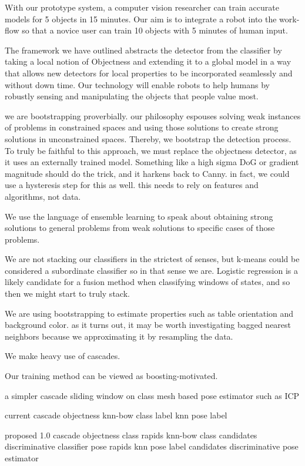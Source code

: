 \documentclass[12pt]{article}
\numberwithin{equation}{section}
\numberwithin{table}{section}
\numberwithin{figure}{section}
\begin{document}
With our prototype system, a computer vision researcher can train accurate models for 5
objects in 15 minutes. Our aim is to integrate a robot into the work-flow so that a novice
user can train 10 objects with 5 minutes of human input.

The framework we have outlined abstracts the detector from the classifier by taking a local notion 
of Objectness and extending it to a global model in a way that allows new detectors 
for local properties to be incorporated seamlessly and without down time.  Our technology 
will enable robots to help humans by robustly sensing and manipulating the objects that people value most.

\newpage

we are bootstrapping proverbially. our philosophy espouses solving weak instances of problems in constrained spaces and using those solutions to create strong solutions in unconstrained spaces.  Thereby, we bootstrap the detection process. To truly be faithful to this approach, we must replace the objectness detector, as it uses an externally trained model. Something like a high sigma DoG or gradient magnitude should do the trick, and it harkens back to Canny.  in fact, we could use a hysteresis step for this as well. this needs to rely on features and algorithms, not data.

We use the language of ensemble learning to speak about obtaining strong solutions to general problems from weak solutions to specific cases of those problems. 

We are not stacking our classifiers in the strictest of senses, but k-means could be considered a subordinate classifier so in that sense we are.  Logistic regression is a likely candidate for a fusion method when classifying windows of states, and so then we might start to truly stack.

We are using bootstrapping to estimate properties such as table orientation and background color. as it turns out, it may be worth investigating bagged nearest neighbors because we approximating it by resampling the data.

We make heavy use of cascades.

Our training method can be viewed as boosting-motivated.

a simpler cascade
sliding window on class
mesh based pose estimator such as ICP

current cascade
objectness
knn-bow class label
knn pose label


proposed 1.0 cascade
objectness
class rapids
knn-bow class candidates
discriminative classifier
pose rapids
knn pose label candidates
discriminative pose estimator
\end{document}
